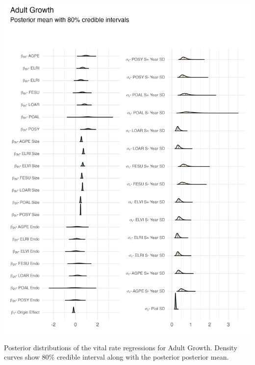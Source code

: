 \documentclass[lineno, sn-basic]{sn-jnl}%
\begin{document}
\begin{myfigure}[H]
	\centering
	\includegraphics[width = \linewidth]{grow_posteriors_plot.png}
	\caption[Posterior distributions of the vital rate regressions for Adult Growth]{Posterior distributions of the vital rate regressions for Adult Growth. Density curves show $80\%$ credible interval along with the posterior posterior mean.}
\end{myfigure}
\end{document}
